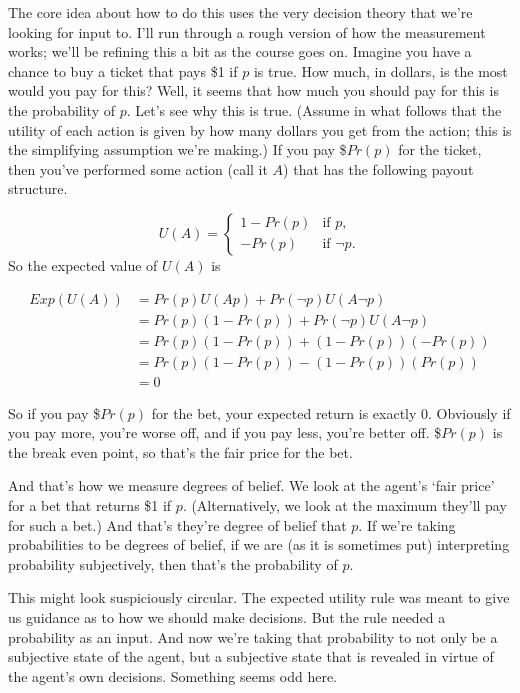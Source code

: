 The core idea about how to do this uses the very decision theory that we're looking for input to. I'll run through a rough version of how the measurement works; we'll be refining this a bit as the course goes on. Imagine you have a chance to buy a ticket that pays \$1 if $p$ is true. How much, in dollars, is the most would you pay for this? Well, it seems that how much you should pay for this is the probability of $p$. Let's see why this is true. (Assume in what follows that the utility of each action is given by how many dollars you get from the action; this is the simplifying assumption we're making.) If you pay \$$Pr(p)$ for the ticket, then you've performed some action (call it $A$) that has the following payout structure.

\begin{equation*}
U(A)= 
\begin{cases} 1 - Pr(p) & \text{if $p$,}
\\
-Pr(p) & \text{if $\neg p$.}
\end{cases}
\end{equation*}
So the expected value of $U(A)$ is

\begin{align*}
Exp(U(A)) &= Pr(p)U(Ap) + Pr(\neg p)U(A \neg p) \\
 &= Pr(p)(1 - Pr(p)) + Pr(\neg p)U(A \neg p) \\
 &= Pr(p)(1 - Pr(p)) + (1 - Pr(p))(-Pr(p)) \\
 &= Pr(p)(1 - Pr(p)) - (1 - Pr(p))(Pr(p)) \\
 &= 0
\end{align*}

So if you pay \$$Pr(p)$ for the bet, your expected return is exactly 0. Obviously if you pay more, you're worse off, and if you pay less, you're better off. \$$Pr(p)$ is the break even point, so that's the fair price for the bet.

And that's how we measure degrees of belief. We look at the agent's `fair price' for a bet that returns \$1 if $p$. (Alternatively, we look at the maximum they'll pay for such a bet.) And that's they're degree of belief that $p$. If we're taking probabilities to be degrees of belief, if we are (as it is sometimes put) interpreting probability subjectively, then that's the probability of $p$.

This might look suspiciously circular. The expected utility rule was meant to give us guidance as to how we should make decisions. But the rule needed a probability as an input. And now we're taking that probability to not only be a subjective state of the agent, but a subjective state that is revealed in virtue of the agent's own decisions. Something seems odd here.

